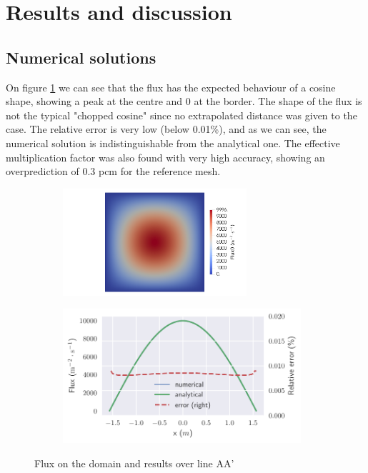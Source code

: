 
\section{Results and discussion}

\subsection{Numerical solutions}

On figure \ref{fig:flux0} we can see that the flux has the expected behaviour of a cosine shape, showing a peak at the centre and 0 at the border.
The shape of the flux is not the typical "chopped cosine" since no extrapolated distance was given to the case.
The relative error is very low (below 0.01\%), and as we can see, the numerical solution is indistinguishable from the analytical one.
The effective multiplication factor was also found with very high accuracy, showing an overprediction of 0.3 pcm for the reference mesh.

\begin{figure}[htbp]
    \centering
    \begin{subfigure}[b]{0.42\textwidth}
        \includegraphics[width=68mm, trim={18cm 0 0 0}, clip]{3_results_and_discussion/figures/flux0.png}
    \end{subfigure}
    \begin{subfigure}[b]{0.56\textwidth}
        \includegraphics[width=88mm]{3_results_and_discussion/figures/flux0.pdf}
    \end{subfigure}
    \caption{Flux on the domain and results over line AA'}
    \label{fig:flux0}
\end{figure}

